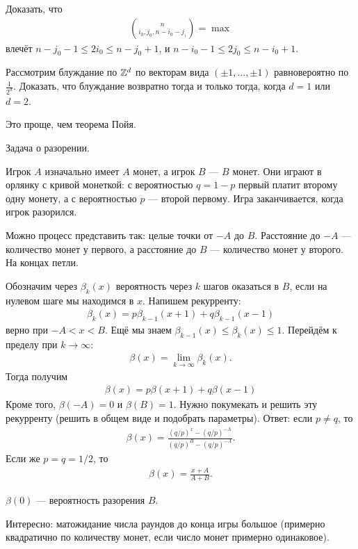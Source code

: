 \documentclass[../main.tex]{subfiles}
\begin{document}
\begin{exercs*}
 Доказать, что 
 \begin{align*}
  \binom{n}{i_0,j_0,n-i_0-j_)} = \max
 \end{align*} влечёт $ n-j_0-1 \leqslant 2i_0 \leqslant n - j_0 + 1 $, и $ n-i_0 - 1 \leqslant 2j_0 \leqslant n - i_0 + 1 $.
\end{exercs*}
\begin{exercs*}
 Рассмотрим блуждание по $ \mathbb{Z}^{d} $ по векторам вида $ (\pm 1, \ldots, \pm 1) $ равновероятно по $ \frac{1}{2^{d}} $. Доказать, что блуждание возвратно тогда и только тогда, когда $ d = 1 $ или $ d = 2 $.

 Это проще, чем теорема Пойя.
\end{exercs*}

Задача о разорении.

 Игрок $ A $ изначально имеет $ A $ монет, а игрок $ B $ --- $ B $ монет. Они играют в орлянку с кривой монеткой: с вероятностью $ q=1-p $ первый платит второму одну монету, а с вероятностью $ p $ --- второй первому. Игра заканчивается, когда игрок разорился.

 Можно процесс представить так: целые точки от $ -A $ до $ B $. Расстояние до $ -A $ --- количество монет у первого, а расстояние до $ B $ --- количество монет у второго. На концах петли. 

 Обозначим через $ \beta_k(x) $ вероятность через $ k $ шагов оказаться в $ B $, если на нулевом шаге мы находимся в $ x $. Напишем рекурренту:
 \begin{align*}
  \beta_k(x) = p \beta_{k-1}(x + 1) + q \beta_{k-1}(x-1)
 \end{align*} верно при $ -A < x < B $. Ещё мы знаем $ \beta_{k-1}(x) \leqslant \beta_k(x) \leqslant 1$. Перейдём к пределу при $ k \to \infty $:
 \begin{align*}
  \beta(x) = \lim_{k \to \infty} \beta_k(x).
 \end{align*} Тогда получим
 \begin{align*}
  \beta(x) = p\beta(x+1) +q\beta(x-1)
 \end{align*} Кроме того, $ \beta(-A) = 0 $ и $ \beta(B) = 1 $. Нужно покумекать и решить эту рекурренту (решить в общем виде и подобрать параметры). Ответ: если $ p \neq q $, то
 \begin{align*}
  \beta(x) = \frac{(q / p)^{x} - (q / p)^{-A}}{(q / p) ^{B} - (q/ p)^{-A}}.
 \end{align*} Если же $ p = q = 1 / 2 $, то
 \begin{align*}
  \beta(x) = \frac{x+A}{A+B}.
 \end{align*}

 $ \beta(0) $ --- вероятность разорения $B$. 

 Интересно: матожидание числа раундов до конца игры большое (примерно квадратично по количеству монет, если число монет примерно одинаковое).
\end{document}
